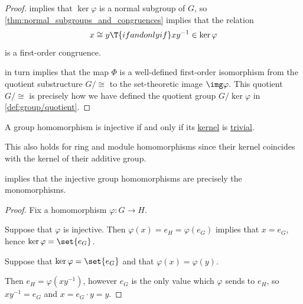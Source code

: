 \begin{proof}
   implies that \( \ker \varphi \) is a normal subgroup of \( G \), so \cref{thm:normal_subgroups_and_congruences} implies that the relation
  \begin{equation*}
    x \cong y \T{if and only if} xy^{-1} \in \ker \varphi
  \end{equation*}
  is a first-order congruence.

   in turn implies that the map \( \Phi \) is a well-defined first-order isomorphism from the quotient substructure \( G / {\cong} \) to the set-theoretic image \( \img \varphi \). This quotient \( G / {\cong} \) is precisely how we have defined the quotient group \( G / \ker \varphi \) in \cref{def:group/quotient}.
\end{proof}

\begin{proposition}\label{thm:group_homomorphism_trivial_kernel}
  A group homomorphism is injective if and only if its \hyperref[def:group/kernel]{kernel} is \hyperref[def:group/trivial]{trivial}.
\end{proposition}
\begin{comments}
  \item This also holds for ring and module homomorphisms since their kernel coincides with the kernel of their additive group.

  \item {} implies that the injective group homomorphisms are precisely the monomorphisms.
\end{comments}
\begin{proof}
  Fix a homomorphism \( \varphi: G \to H \).

  \SufficiencySubProof Suppose that \( \varphi \) is injective. Then \( \varphi(x) = e_H = \varphi(e_G) \) implies that \( x = e_G \), hence \( \ker \varphi = \set{ e_G } \).

  \NecessitySubProof Suppose that \( \ker \varphi = \set{ e_G } \) and that \( \varphi(x) = \varphi(y) \).

  Then \( e_H = \varphi(xy^{-1}) \), however \( e_G \) is the only value which \( \varphi \) sends to \( e_H \), so \( xy^{-1} = e_G \) and \( x = e_G \cdot y = y \).
\end{proof}

